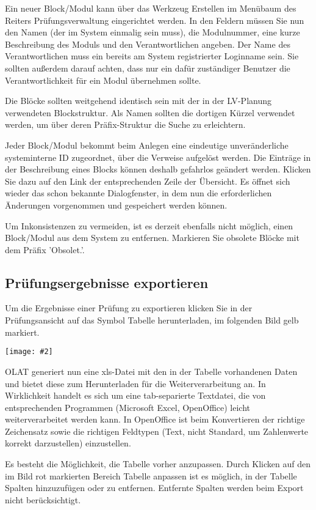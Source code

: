 \documentclass[a4paper,11pt]{article}
\newcommand{\bild}[2]{
    \begin{center}\texttt{[image: \#2]}\end{center}
}
\newcommand{\knopf}[1]{{\sc #1}}
\begin{document}
Ein neuer Block/Modul kann über das Werkzeug \knopf{Erstellen} im Menübaum des
Reiters \knopf{Prüfungsverwaltung} eingerichtet werden. In den Feldern müssen
Sie nun den Namen (der im System einmalig sein muss), die Modulnummer, eine
kurze Beschreibung des Moduls und den Verantwortlichen angeben. Der Name des
Verantwortlichen muss ein bereits am System registrierter Loginname sein. Sie
sollten außerdem darauf achten, dass nur ein dafür zuständiger Benutzer die
Verantwortlichkeit für ein Modul übernehmen sollte.

Die Blöcke sollten weitgehend identisch sein mit der in der LV-Planung
verwendeten Block\-struktur. Als Namen sollten die dortigen Kürzel verwendet
werden, um über deren Präfix-Struktur die Suche zu erleichtern. 

Jeder Block/Modul bekommt beim Anlegen eine eindeutige unveränderliche
systeminterne ID zugeordnet, über die Verweise aufgelöst werden.  Die Einträge
in der Beschreibung eines Blocks können deshalb gefahrlos geändert werden.
Klicken Sie dazu auf den Link der entsprechenden Zeile der Übersicht.  Es
öffnet sich wieder das schon bekannte Dialogfenster, in dem nun die
erforderlichen Änderungen vorgenommen und gespeichert werden können. 

Um Inkonsistenzen zu vermeiden, ist es derzeit ebenfalls nicht möglich, einen
Block/Modul aus dem System zu entfernen. Markieren Sie obsolete Blöcke mit dem
Präfix 'Obsolet.'. 

\subsection{Prüfungsergebnisse exportieren}

Um die Ergebnisse einer Prüfung zu exportieren klicken Sie in der
Prüfungsansicht auf das Symbol \knopf{Tabelle herunterladen}, im folgenden
Bild gelb markiert.

\bild{.9}{Ergebnis-Exportieren}

OLAT generiert nun eine xls-Datei mit den in der Tabelle vorhandenen Daten und
bietet diese zum Herunterladen für die Weiterverarbeitung an.  In Wirklichkeit
handelt es sich um eine tab-separierte Textdatei, die von entsprechenden
Programmen (Microsoft Excel, OpenOffice) leicht weiterverarbeitet werden kann.
In OpenOffice ist beim Konvertieren der richtige Zeichensatz sowie die
richtigen Feldtypen (Text, nicht Standard, um Zahlenwerte korrekt
darzustellen) einzustellen.

Es besteht die Möglichkeit, die Tabelle vorher anzupassen. Durch Klicken auf
den im Bild rot markierten Bereich \knopf{Tabelle anpassen} ist es möglich, in
der Tabelle Spalten hinzuzufügen oder zu entfernen. Entfernte Spalten werden
beim Export nicht berücksichtigt.
\end{document}
